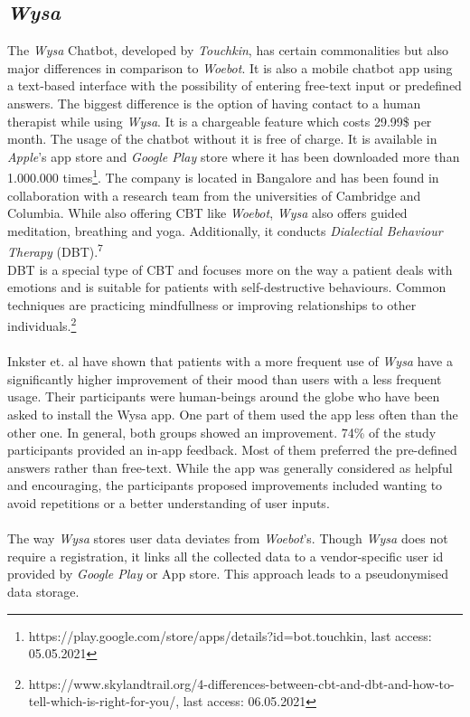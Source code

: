 \documentclass[sigconf, nonacm]{acmart}
\begin{document}
\subsection{\emph{Wysa}}
\label{sec:two_two}
The \emph{Wysa} Chatbot, developed by \emph{Touchkin}, has certain commonalities but also major differences in comparison to \emph{Woebot}. It is also a mobile chatbot app using a text-based interface with the possibility of entering 
free-text input or predefined answers. The biggest difference is the option of having contact to 
a human therapist while using \emph{Wysa}. It is a chargeable feature which costs 29.99\$ per month. The usage of the chatbot without it is free of charge. It is available
in \emph{Apple}'s app store and \emph{Google Play} store where it has been downloaded more than 1.000.000 times\footnote{https://play.google.com/store/apps/details?id=bot.touchkin, last access: 05.05.2021}. 
The company is located in Bangalore and has been found in collaboration with a research team from the universities of Cambridge and Columbia.
While also offering CBT like \emph{Woebot}, \emph{Wysa} also offers guided meditation, breathing and yoga. Additionally, it conducts \emph{Dialectial Behaviour Therapy} (DBT).\textsuperscript{7} 
\\
DBT is a special type of CBT and focuses more on the way a patient deals with emotions and is suitable for patients with self-destructive behaviours. Common techniques are practicing mindfullness or 
improving relationships to other individuals.\footnote{https://www.skylandtrail.org/4-differences-between-cbt-and-dbt-and-how-to-tell-which-is-right-for-you/, last access: 06.05.2021} 
\\\\
Inkster et. al \cite{Inkster} have shown that patients with a more frequent use of \emph{Wysa} have a significantly higher improvement of their mood than users
with a less frequent usage. Their participants were human-beings around the globe who have been asked to install the Wysa app. One part of them used the app less often than the other one. In general, both groups showed an improvement. 74\% of the study participants provided an in-app feedback. Most of them preferred the pre-defined answers rather than free-text.
While the app was generally considered as helpful and encouraging, the participants proposed improvements included wanting to avoid repetitions or a better understanding of user inputs.
\\\\
The way \emph{Wysa} stores user data deviates from \emph{Woebot}'s. Though \emph{Wysa} does not require a registration, it links all the collected data to a vendor-specific user id provided by \emph{Google Play} or App store. This approach leads to a pseudonymised data storage.
\end{document}
